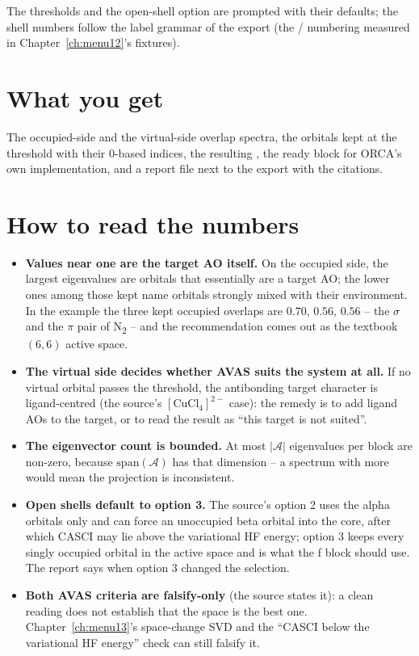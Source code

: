 The thresholds and the open-shell option are prompted with their defaults; the
shell numbers follow the label grammar of the export (the /
numbering measured in Chapter~\ref{ch:menu12}'s fixtures).

\section{What you get}

The occupied-side and the virtual-side overlap spectra, the orbitals kept at
the threshold with their 0-based indices, the resulting
, the ready  block for
ORCA's own implementation, and a report file next to the export with the
citations.

\section{How to read the numbers}

\begin{readbox}
\begin{itemize}
  \item \textbf{Values near one are the target AO itself.} On the occupied
    side, the largest eigenvalues are orbitals that essentially are a target
    AO; the lower ones among those kept name orbitals strongly mixed with
    their environment. In the example the three kept occupied overlaps are
    $0.70$, $0.56$, $0.56$ -- the $\sigma$ and the $\pi$ pair of
    N\textsubscript{2} -- and the recommendation comes out as the textbook
    $(6,6)$ active space.
  \item \textbf{The virtual side decides whether AVAS suits the system at
    all.} If no virtual orbital passes the threshold, the antibonding target
    character is ligand-centred (the source's $[\mathrm{CuCl}_4]^{2-}$ case):
    the remedy is to add ligand AOs to the target, or to read the result as
    ``this target is not suited''.
  \item \textbf{The eigenvector count is bounded.} At most $|\mathcal{A}|$
    eigenvalues per block are non-zero, because $\mathrm{span}(\mathcal{A})$
    has that dimension -- a spectrum with more would mean the projection is
    inconsistent.
  \item \textbf{Open shells default to option 3.} The source's option 2 uses
    the alpha orbitals only and can force an unoccupied beta orbital into the
    core, after which CASCI may lie above the variational HF energy; option 3
    keeps every singly occupied orbital in the active space and is what the
    f block should use. The report says when option 3 changed the selection.
  \item \textbf{Both AVAS criteria are falsify-only} (the source states it):
    a clean reading does not establish that the space is the best one.
    Chapter~\ref{ch:menu13}'s space-change SVD and the ``CASCI below the
    variational HF energy'' check can still falsify it.
\end{itemize}
\end{readbox}

